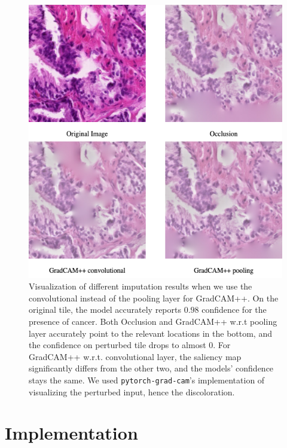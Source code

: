 \begin{figure}
    \begin{center}
    \begin{minipage}{0.7\textwidth}
      \includegraphics[width=\textwidth]{img/gradcampp-road-conv-vs-pool.png}
    \end{minipage}
    \caption{Visualization of different imputation results when we use the convolutional instead of the pooling layer for GradCAM++. On the original tile, the model accurately reports $0.98$ confidence for the presence of cancer. Both Occlusion and GradCAM++ w.r.t pooling layer accurately point to the relevant locations in the bottom, and the confidence on perturbed tile drops to almost $0$. For GradCAM++ w.r.t. convolutional layer, the saliency map significantly differs from the other two, and the models' confidence stays the same. We used \texttt{pytorch-grad-cam}'s implementation of visualizing the perturbed input, hence the discoloration.}
    \label{fig:gradcampp-road-conv-vs-pool}
    \end{center}
\end{figure}

\section{Implementation}


